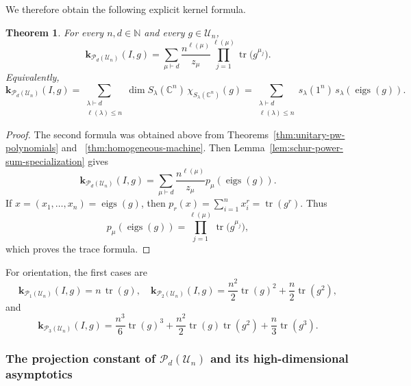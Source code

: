 \documentclass[11pt,showkeys]{amsart}
\newtheorem{theorem}{Theorem}[section]
\begin{document}
We therefore obtain the following explicit kernel formula.

\begin{theorem}
\label{thm:unitary-reproducing-kernel}
For every \(n,d\in\mathbb N\) and every \(g\in\mathcal U_n\),
\[
        \mathbf k_{\mathcal P_d(\mathcal U_n)}(I,g)
        =
        \sum_{\mu\vdash d}
        \frac{n^{\ell(\mu)}}{z_\mu}
        \prod_{j=1}^{\ell(\mu)}
        \operatorname{tr}\bigl(g^{\mu_j}\bigr).
\]
Equivalently,
\[
        \mathbf k_{\mathcal P_d(\mathcal U_n)}(I,g)
        =
        \sum_{\substack{\lambda\vdash d\\ \ell(\lambda)\le n}}
        \dim S_\lambda(\mathbb C^n)\,
        \chi_{S_\lambda(\mathbb C^n)}(g)
        =
        \sum_{\substack{\lambda\vdash d\\ \ell(\lambda)\le n}}
        s_\lambda(1^n)\,
        s_\lambda(\operatorname{eigs}(g)).
\]
\end{theorem}

\begin{proof}
The second formula was obtained above from
Theorems~\ref{thm:unitary-pw-polynomials} and ~\ref{thm:homogeneous-machine}. Then Lemma~\ref{lem:schur-power-sum-specialization}
 gives
\[
        \mathbf k_{\mathcal P_d(\mathcal U_n)}(I,g)
        =
        \sum_{\mu\vdash d}
        \frac{n^{\ell(\mu)}}{z_\mu}
        p_\mu(\operatorname{eigs}(g)).
\]
If \(x=(x_1,\ldots,x_n)=\operatorname{eigs}(g)\), then
\(
        p_r(x)=\sum_{i=1}^n x_i^r=\operatorname{tr}(g^r).
\)
Thus
\[
        p_\mu(\operatorname{eigs}(g))
        =
        \prod_{j=1}^{\ell(\mu)}
        \operatorname{tr}\bigl(g^{\mu_j}\bigr),
\]
which proves the trace formula.
\end{proof}

For orientation, the first cases are
\[
        \mathbf k_{\mathcal P_1(\mathcal U_n)}(I,g)
        =
        n\,\operatorname{tr}(g),\quad
        \mathbf k_{\mathcal P_2(\mathcal U_n)}(I,g)
        =
        \frac{n^2}{2}\operatorname{tr}(g)^2
        +
        \frac{n}{2}\operatorname{tr}(g^2),
\]
and
\[
        \mathbf k_{\mathcal P_3(\mathcal U_n)}(I,g)
        =
        \frac{n^3}{6}\operatorname{tr}(g)^3
        +
        \frac{n^2}{2}\operatorname{tr}(g)\operatorname{tr}(g^2)
        +
        \frac{n}{3}\operatorname{tr}(g^3).
\]



\subsubsection{The projection constant of
\(\mathcal P_d(\mathcal U_n)\) and its high-dimensional asymptotics}
\label{sec:unitary-high-dimensional-asymptotics}
\end{document}

